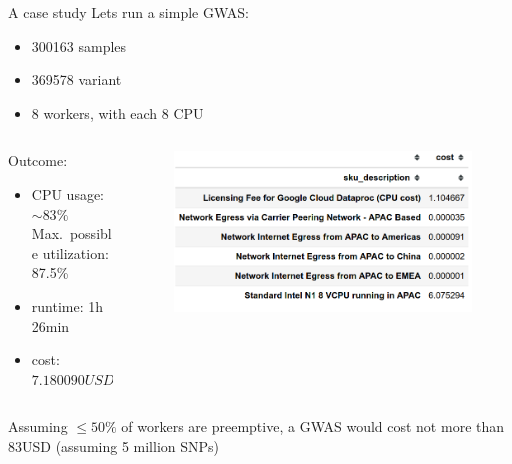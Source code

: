 \documentclass{beamer}
\begin{document}
\begin{frame}{A case study}
  Lets run a simple GWAS:
  \begin{itemize}
    \item 300163 samples
    \item 369578 variant
    \item 8 workers, with each 8 CPU
  \end{itemize}
  \begin{columns}
    \begin{column}{0.5\textwidth}
      Outcome:
      \begin{itemize}
        \item CPU usage: $\sim 83\%$ \\
          Max.\ possible utilization: 87.5\%
        \item runtime: 1h 26min
        \item cost: $7.180090USD$
      \end{itemize}
    \end{column}
    \begin{column}{0.5\textwidth}
      \begin{figure}[htpb]
        \centering
        \includegraphics[width=0.99\linewidth]{figure/cost_gwas.png}
      \end{figure}
    \end{column}
  \end{columns}
  Assuming $\leq 50\%$ of workers are preemptive, a GWAS would cost not more than $83$USD (assuming 5 million SNPs)
\end{frame}
\end{document}
